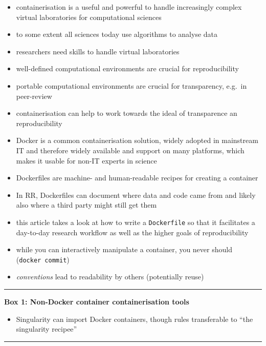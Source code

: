 \documentclass[10pt,letterpaper]{article}
\providecommand{\tightlist}{%
  \setlength{\itemsep}{0pt}\setlength{\parskip}{0pt}}
\begin{document}
\begin{itemize}
\tightlist
\item
  containerisation is a useful and powerful to handle increasingly
  complex virtual laboratories for computational sciences
\item
  to some extent all sciences today use algorithms to analyse data
\item
  researchers need skills to handle virtual laboratories
\item
  well-defined computational environments are crucial for
  reproducibility
\item
  portable computational environments are crucial for transparency,
  e.g.~in peer-review
\item
  containerisation can help to work towards the ideal of transparence an
  reproducibility
\item
  Docker is a common containerisation solution, widely adopted in
  mainstream IT and therefore widely available and support on many
  platforms, which makes it usable for non-IT experts in science
\item
  Dockerfiles are machine- and human-readable recipes for creating a
  container
\item
  In RR, Dockerfiles can document where data and code came from and
  likely also where a third party might still get them
\item
  this article takes a look at how to write a \texttt{Dockerfile} so
  that it facilitates a day-to-day research workflow as well as the
  higher goals of reproducibility
\item
  while you can interactively manipulate a container, you never should
  (\texttt{docker\ commit})
\item
  \emph{conventions} lead to readability by others (potentially reuse)
\end{itemize}

\begin{center}\rule{0.5\linewidth}{\linethickness}\end{center}

\textbf{Box 1: Non-Docker container containerisation tools}

\begin{itemize}
\tightlist
\item
  Singularity can import Docker containers, though rules transferable to
  ``the singularity recipee''
\end{itemize}

\begin{center}\rule{0.5\linewidth}{\linethickness}\end{center}
\end{document}
